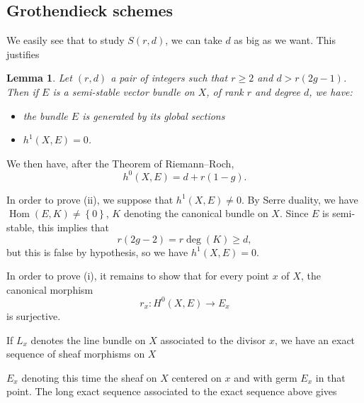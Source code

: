 \documentclass[12pt,a4paper]{book}
\DeclareMathOperator\Hom{Hom}
\newtheorem{lemma}[thm]{Lemma}
\theoremstyle{definition} \newtheorem{defn}[thm]{Definition}
\theoremstyle{definition} \newtheorem{ejs}[thm]{Examples}
\theoremstyle{definition} \newtheorem{ej}[thm]{Example}
\begin{document}
  \subsection{Grothendieck schemes}
  We easily see that to study $S(r,d)$, we can take $d$ as big as we want. This justifies 
  \begin{lemma}\label{1.20}
    Let $(r,d)$ a pair of integers such that $r\geq 2$ and $d> r(2g-1)$. Then if $E$ is a semi-stable vector bundle on $X$, of rank $r$ and degree $d$, we have:
    \begin{itemize}
      \item[\rm (i)] the bundle $E$ is generated by its global sections
      \item[\rm (ii)] $h^1(X,E)=0$.
    \end{itemize}
  \end{lemma}

  We then have, after the Theorem of Riemann--Roch,
  \begin{equation*}
    h^0(X,E)=d+r(1-g).
  \end{equation*}

  In order to prove (ii), we suppose that $h^1(X,E)\neq 0$. By Serre duality, we have $\Hom(E,K)\neq \left\{ 0 \right\}$, $K$ denoting the canonical bundle on $X$. Since $E$ is semi-stable, this implies that
  \begin{equation*}
    r(2g-2) = r\deg(K) \geq d,
  \end{equation*}
   but this is false by hypothesis, so we have $h^1(X,E)=0$.

   In order to prove (i), it remains to show that for every point $x$ of $X$, the canonical morphism
   \begin{equation*}
     r_x: H^0(X,E) \longrightarrow E_x
   \end{equation*}
   is surjective.

   If $L_x$ denotes the line bundle on $X$ associated to the divisor $x$, we have an exact sequence of sheaf morphisms on $X$
   \begin{center}
   \end{center}
   $E_x$ denoting this time the sheaf on $X$ centered on $x$ and with germ $E_x$ in that point. The long exact sequence associated to the exact sequence above gives
   \begin{center}
   \end{center}
\end{document}

